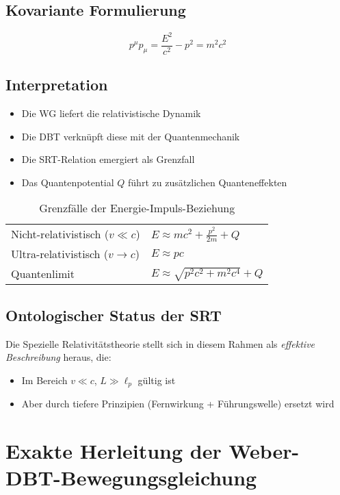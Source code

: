 \subsection{Kovariante Formulierung}
\begin{equation}
p^\mu p_\mu = \frac{E^2}{c^2} - p^2 = m^2c^2
\end{equation}

\subsection{Interpretation}
\begin{itemize}
\item Die WG liefert die relativistische Dynamik
\item Die DBT verknüpft diese mit der Quantenmechanik
\item Die SRT-Relation emergiert als Grenzfall
\item Das Quantenpotential $Q$ führt zu zusätzlichen Quanteneffekten
\end{itemize}

\begin{table}[h]
\centering
\caption{Grenzfälle der Energie-Impuls-Beziehung}
\begin{tabular}{ll}
\hline
Nicht-relativistisch ($v \ll c$) & $E \approx mc^2 + \frac{p^2}{2m} + Q$ \\
Ultra-relativistisch ($v \to c$) & $E \approx pc$ \\
Quantenlimit & $E \approx \sqrt{p^2c^2 + m^2c^4} + Q$ \\
\hline
\end{tabular}
\end{table}

\subsection*{Ontologischer Status der SRT}
Die Spezielle Relativitätstheorie stellt sich in diesem Rahmen als \textit{effektive Beschreibung} heraus, die:
\begin{itemize}
\item Im Bereich \( v \ll c \), \( L \gg \ell_p \) gültig ist
\item Aber durch tiefere Prinzipien (Fernwirkung + Führungswelle) ersetzt wird
\end{itemize}

\section{Exakte Herleitung der Weber-DBT-Bewegungsgleichung}
\label{sec:exact_derivation}

